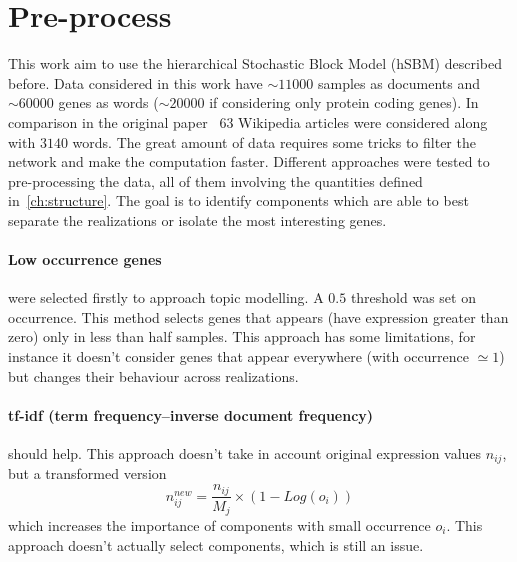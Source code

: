 \section{Pre-process}
This work aim to use the hierarchical Stochastic Block Model (hSBM) described before. Data considered in this work have $\sim 11000$ samples as documents and $\sim 60000$ genes as words ($\sim 20000$ if considering only protein coding genes). In comparison in the original paper~\cite{gerlach2018network} $63$ Wikipedia articles were considered along with $3140$ words. The great amount of data requires some tricks to filter the network and make the computation faster.
Different approaches were tested to pre-processing the data, all of them involving the quantities defined in~\ref{ch:structure}. The goal is to identify components which are able to best separate the realizations or isolate the most interesting genes. 
\paragraph{Low occurrence genes} were selected firstly to approach topic modelling. A $0.5$ threshold was set on occurrence. This method selects genes that appears (have expression greater than zero) only in less than half samples. This approach has some limitations, for instance it doesn't consider genes that appear everywhere (with occurrence $\simeq 1$) but changes their behaviour across realizations.

\paragraph{tf-idf (term frequency–inverse document frequency)} should help. This approach doesn't take in account original expression values $n_{ij}$, but a transformed version
\[
n^{new}_{ij}=\frac{n_{i j}}{M_j}\times \left(1-Log\left(o_i\right)\right)
\] which increases the importance of components with small occurrence $o_i$. This approach doesn't actually select components, which is still an issue.

